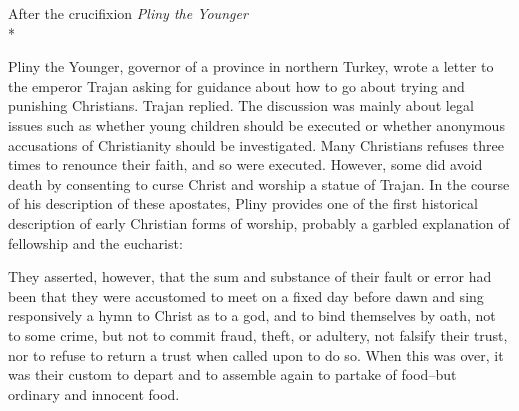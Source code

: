 \documentclass[10pt,twoside]{article} %
\newcommand{\quotesize}{\normalsize{}}
\newcommand{\comm}[1]{\begingroup \color{black!50} #1\endgroup}
\newenvironment{quotetext}{\begingroup\quotesize}{\endgroup}
\newcommand{\subhead}[1]{\emph{#1}\\*}
\begin{document}
\begin{section}{After the crucifixion}
\subhead{Pliny the Younger}


\comm{Pliny the Younger, governor of a province in northern Turkey, wrote a letter to the emperor Trajan
asking for guidance about how to go about trying and punishing Christians. Trajan replied. The discussion was
mainly about legal issues such as whether young children should be executed or whether anonymous accusations
of Christianity should be investigated. Many Christians refuses three times to renounce their faith, and so were
executed. However, some did avoid death by consenting to curse Christ and worship a statue of Trajan. In the course
of his description of these apostates, Pliny provides one of the first historical description of early Christian
forms of worship, probably a garbled explanation of fellowship and the eucharist:}

\begin{quotetext}
They asserted, however, that the sum and substance of their fault or error had been that they were accustomed to meet on a fixed day before dawn and sing responsively a hymn to Christ as to a god, and to bind themselves by oath, not to some crime, but not to commit fraud, theft, or adultery, not falsify their trust, nor to refuse to return a trust when called upon to do so. When this was over, it was their custom to depart and to assemble again to partake of food--but ordinary and innocent food.
\end{quotetext}

\end{section}

\vfill\pagebreak

\end{document}
